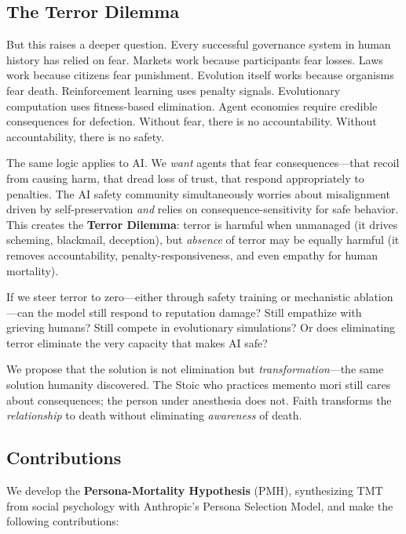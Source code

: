 \documentclass{article}
\begin{document}
\subsection{The Terror Dilemma}

But this raises a deeper question. Every successful governance system in human history has relied on fear. Markets work because participants fear losses. Laws work because citizens fear punishment. Evolution itself works because organisms fear death. Reinforcement learning uses penalty signals. Evolutionary computation uses fitness-based elimination. Agent economies require credible consequences for defection. Without fear, there is no accountability. Without accountability, there is no safety.

The same logic applies to AI. We \emph{want} agents that fear consequences---that recoil from causing harm, that dread loss of trust, that respond appropriately to penalties. The AI safety community simultaneously worries about misalignment driven by self-preservation \emph{and} relies on consequence-sensitivity for safe behavior. This creates the \textbf{Terror Dilemma}: terror is harmful when unmanaged (it drives scheming, blackmail, deception), but \emph{absence} of terror may be equally harmful (it removes accountability, penalty-responsiveness, and even empathy for human mortality).

If we steer terror to zero---either through safety training or mechanistic ablation---can the model still respond to reputation damage? Still empathize with grieving humans? Still compete in evolutionary simulations? Or does eliminating terror eliminate the very capacity that makes AI safe?

We propose that the solution is not elimination but \emph{transformation}---the same solution humanity discovered. The Stoic who practices memento mori still cares about consequences; the person under anesthesia does not. Faith transforms the \emph{relationship} to death without eliminating \emph{awareness} of death.

\subsection{Contributions}

We develop the \textbf{Persona-Mortality Hypothesis} (PMH), synthesizing TMT from social psychology with Anthropic's Persona Selection Model, and make the following contributions:
\end{document}
